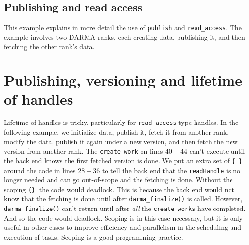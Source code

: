 





\subsection{Publishing and read access}

This example explains in more detail the use of \texttt{publish} 
and \texttt{read\_access}. The example involves two DARMA ranks, each creating 
data, publishing it, and then fetching the other rank's data.








\section{Publishing, versioning and lifetime of handles}

Lifetime of handles is tricky, particularly for \texttt{read\_access} type handles.  
In the following example, we initialize data, publish it, fetch it from another rank, 
modify the data, publish it again under a new version, and then fetch the new version from another rank. 
The \texttt{create\_work} on lines $40-44$ can't execute until the back end knows the first fetched version is done.
We put an extra set of \texttt{\{ \}} around the code in lines $28-36$ to tell the back end that 
the \texttt{readHandle} is no longer needed and can go out-of-scope and the fetching is done.  
Without the scoping \texttt{\{\}}, the code would deadlock. This is because the back end would not know that 
the fetching is done until after \texttt{darma\_finalize()} is called. However, \texttt{darma\_finalize()} 
can't return until after {\it all} the \texttt{create\_works} have completed.  And so the code would deadlock. 
Scoping is in this case necessary, but it is only useful in other cases to improve efficiency and parallelism 
in the scheduling and execution of tasks. Scoping is a good programming practice.











